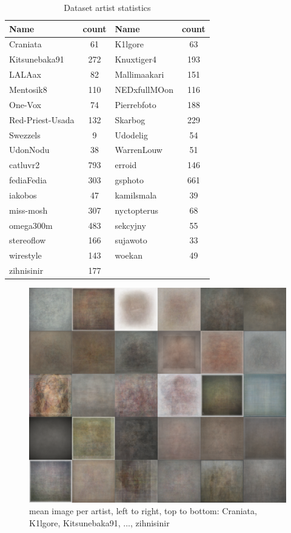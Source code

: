 
\begin{table}[htb]
    \centering
    \begin{tabular}
        { | l | c | l | c|} 
        \hline
        Name & count & Name & count \\
        \hline
    Craniata &  61 & K1lgore & 63 \\
    Kitsunebaka91 & 272  & Knuxtiger4 & 193 \\
    LALAax & 82  & Mallimaakari & 151 \\
    Mentosik8 & 110 & NEDxfullMOon & 116 \\
    One-Vox & 74 & Pierrebfoto & 188 \\
    Red-Priest-Usada & 132 & Skarbog & 229 \\
    Swezzels & 9 & Udodelig & 54 \\
    UdonNodu & 38 & WarrenLouw & 51 \\
    catluvr2 & 793 & erroid & 146 \\
    fediaFedia & 303 & gsphoto & 661 \\
    iakobos & 47 & kamilsmala & 39 \\
    miss-mosh & 307 & nyctopterus & 68 \\
    omega300m & 483 & sekcyjny & 55 \\
    stereoflow & 166 & sujawoto & 33 \\
    wirestyle & 143 & woekan & 49 \\
    zihnisinir & 177 \\

        \hline 
    \end{tabular}
    \caption{Dataset artist statistics}
    \label{datasetstats2}
\end{table}

\begin{figure}[htb]
  \centering
  \includegraphics[width=1\linewidth]{img/datasetAvg.png}
  \caption{mean image per artist, left to right, top to bottom: Craniata, K1lgore, Kitsunebaka91, ..., zihnisinir }
  \label{fig:avgDataset}
\end{figure}